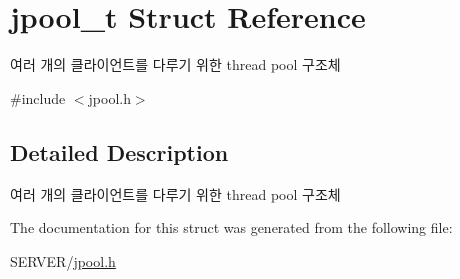 \hypertarget{structjpool__t}{\section{jpool\-\_\-t Struct Reference}
\label{structjpool__t}
}


여러 개의 클라이언트를 다루기 위한 thread pool 구조체  




{\ttfamily \#include $<$jpool.\-h$>$}



\subsection{Detailed Description}
여러 개의 클라이언트를 다루기 위한 thread pool 구조체 

The documentation for this struct was generated from the following file\-:\begin{DoxyCompactItemize}
\item 
S\-E\-R\-V\-E\-R/\hyperlink{jpool_8h}{jpool.\-h}\end{DoxyCompactItemize}
